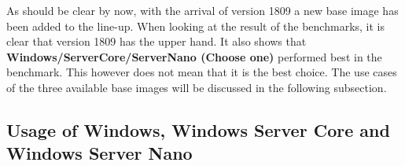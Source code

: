 
As should be clear by now, with the arrival of version 1809 a new base image has been added to the line-up. When looking at the result of the benchmarks, it is clear that version 1809 has the upper hand. It also shows that \textbf{Windows/ServerCore/ServerNano (Choose one)} performed best in the benchmark. This however does not mean that it is the best choice. The use cases of the three available base images will be discussed in the following subsection.

\subsection{Usage of Windows, Windows Server Core and Windows Server Nano}